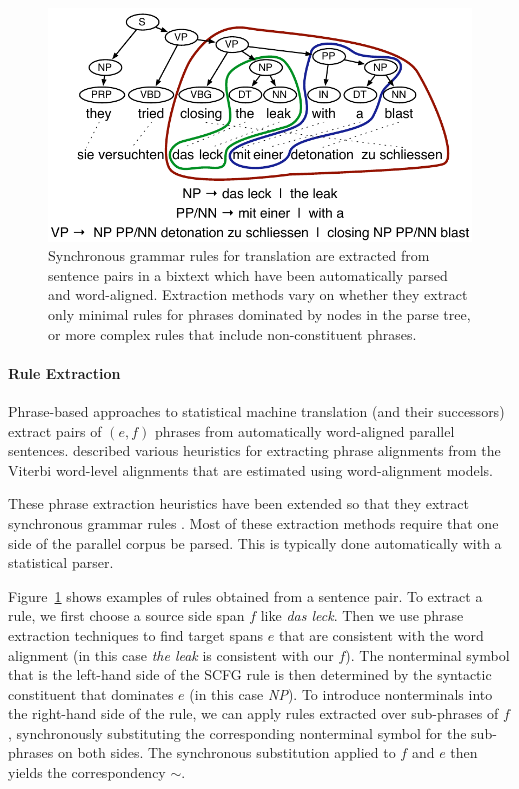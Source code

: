 \documentclass[11pt]{article}
\begin{document}
\begin{figure}[t]
\begin{center}
\includegraphics[width=0.99\linewidth]{figures/example_extraction-3a.pdf}
\end{center}
\caption{Synchronous grammar rules for translation are extracted from
  sentence pairs in a bixtext which have been automatically parsed and
  word-aligned. Extraction methods vary on whether they extract only
  minimal rules for phrases dominated by nodes in the parse tree, or
  more complex rules that include non-constituent phrases.}
\label{example_extraction}
\end{figure}

\paragraph{Rule Extraction}

Phrase-based approaches to statistical machine translation (and their
successors) extract pairs of $(e, f)$ phrases from automatically
word-aligned parallel sentences. 
described various heuristics for extracting phrase alignments from the
Viterbi word-level alignments that are estimated using
 word-alignment models.

These phrase extraction heuristics have been extended so that they
extract synchronous grammar rules
\cite{Galley2004,Chiang2005,Zollmann2006,Liu2006}.  Most of these
extraction methods require that one side of the parallel corpus be
parsed. This is typically done automatically with a statistical
parser.

Figure~\ref{example_extraction} shows examples of rules obtained from
a sentence pair. To extract a rule, we first choose a source side span
$f$ like {\it das leck}.  Then we use phrase extraction techniques to
find target spans $e$ that are consistent with the word alignment (in
this case {\it the leak} is consistent with our $f$). The nonterminal
symbol that is the left-hand side of the SCFG rule is then determined
by the syntactic constituent that dominates $e$ (in this case {\it
  NP}). To introduce nonterminals into the right-hand side of the rule,
we can apply rules extracted over sub-phrases of $f$, synchronously
substituting the corresponding nonterminal symbol for the sub-phrases
on both sides. The synchronous substitution applied to $f$ and $e$
then yields the correspondency $\sim$.
\end{document}
